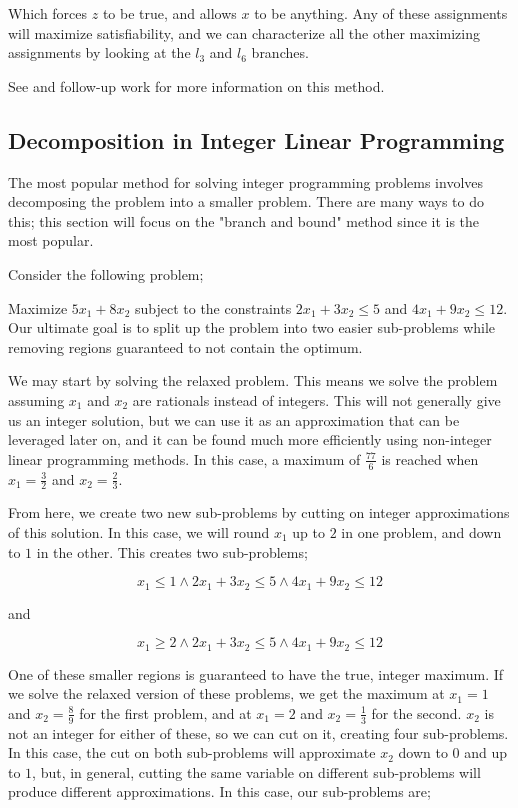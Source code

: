 Which forces $z$ to be true, and allows $x$ to be anything. Any of these assignments will maximize satisfiability, and we can characterize all the other maximizing assignments by looking at the $l_3$ and $l_6$ branches.

See \citep{belov2013sat} and follow-up work for more information on this method.

\subsection{Decomposition in Integer Linear Programming}\label{sec:ilp-blocks}

The most popular method for solving integer programming problems involves decomposing the problem into a smaller problem. There are many ways to do this; this section will focus on the "branch and bound" method since it is the most popular.

Consider the following problem;

Maximize $5x_1 + 8x_2$ subject to the constraints $2x_1 + 3x_2 \leq 5$ and $4x_1 + 9x_2 \leq 12$. Our ultimate goal is to split up the problem into two easier sub-problems while removing regions guaranteed to not contain the optimum.

We may start by solving the relaxed problem. This means we solve the problem assuming $x_1$ and $x_2$ are rationals instead of integers. This will not generally give us an integer solution, but we can use it as an approximation that can be leveraged later on, and it can be found much more efficiently using non-integer linear programming methods. In this case, a maximum of $\frac{77}{6}$ is reached when $x_1 = \frac{3}{2}$ and $x_2 = \frac{2}{3}$.

From here, we create two new sub-problems by cutting on integer approximations of this solution. In this case, we will round $x_1$ up to $2$ in one problem, and down to $1$ in the other. This creates two sub-problems;

\begin{equation}
    x_1 \leq 1 \wedge 2x_1 + 3x_2 \leq 5 \wedge 4x_1 + 9x_2 \leq 12
\end{equation}

and 

\begin{equation}
    x_1 \geq 2 \wedge 2x_1 + 3x_2 \leq 5 \wedge 4x_1 + 9x_2 \leq 12
\end{equation}

One of these smaller regions is guaranteed to have the true, integer maximum. If we solve the relaxed version of these problems, we get the maximum at $x_1 = 1$ and $x_2 = \frac{8}{9}$ for the first problem, and at $x_1 = 2$ and $x_2 = \frac{1}{3}$ for the second. $x_2$ is not an integer for either of these, so we can cut on it, creating four sub-problems. In this case, the cut on both sub-problems will approximate $x_2$ down to $0$ and up to $1$, but, in general, cutting the same variable on different sub-problems will produce different approximations. In this case, our sub-problems are;

